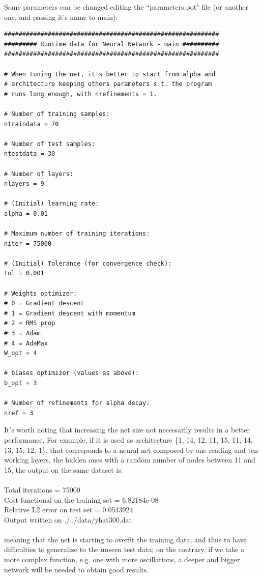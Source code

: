 \documentclass[12pt, a4paper]{report}
\theoremstyle{definition}
\begin{document}
Some parameters can be changed editing the ``parameters.pot" file (or another one, and passing it's name to main):
\begin{lstlisting}[frame=single,showstringspaces=false]
###########################################################
######### Runtime data for Neural Network - main ##########
###########################################################

# When tuning the net, it's better to start from alpha and 
# architecture keeping others parameters s.t. the program 
# runs long enough, with nrefinements = 1. 

# Number of training samples:
ntraindata = 70

# Number of test samples:
ntestdata = 30

# Number of layers:
nlayers = 9

# (Initial) learning rate:
alpha = 0.01

# Maximum number of training iterations:
niter = 75000

# (Initial) Tolerance (for convergence check):
tol = 0.001

# Weights optimizer:
# 0 = Gradient descent
# 1 = Gradient descent with momentum
# 2 = RMS prop
# 3 = Adam
# 4 = AdaMax
W_opt = 4

# biases optimizer (values as above):
b_opt = 3

# Number of refinements for alpha decay:
nref = 3
\end{lstlisting}
It's worth noting that increasing the net size not necessarily results in a better performance. For example, if it is used as architecture {\ttfamily \{1, 14, 12, 11, 15, 11, 14, 13, 15, 12, 1\}}, that corresponds to a neural net composed by one reading and ten working layers, the hidden ones with a random number of nodes between 11 and 15, the output on the same dataset is:\\
{\\ \ttfamily 
Total iterations = 75000\\
Cost functional on the training set = 6.82184e-08\\
Relative L2 error on test set = 0.0543924\\
Output written on ./../data/yhat300.dat\\
\\}
meaning that the net is starting to overfit the training data, and thus to have difficulties to generalize to the unseen test data; on the contrary, if we take a more complex function, e.g. one with more oscillations, a deeper and bigger network will be needed to obtain good results.\\
\end{document}
